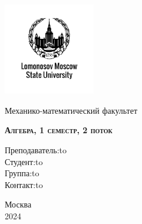 \documentclass[a4paper, 12pt]{article}
\theoremstyle{definition}
\begin{document}
  \begin{titlepage}
    \newpage
    
    \begin{center}
    \includegraphics[width=4cm]{image/image.png}
    \end{center}
    
    \vspace{4em}
    
    \begin{center}
    \Large Механико-математический факультет  
    \end{center}
    
    \vspace{2em}
    
    \begin{center}
    \large{\textsc{\textbf{Алгебра, 1 семестр, 2 поток}}}
    \end{center}
    
    \vspace{6em}
    

    
    \newbox{\lbox}
    \newlength{\maxl}
    \setlength{\maxl}{\wd\lbox}
    \hfill\parbox{11cm}
    {
    \hspace*{5cm}\hspace*{-5cm}Преподаватель:\hfill\hbox to \\

    \hspace*{5cm}\hspace*{-5cm}Студент:\hfill\hbox to\\

    \hspace*{5cm}\hspace*{-5cm}Группа:\hfill\hbox to \\
    
    \hspace*{5cm}\hspace*{-5cm}Контакт:\hfill\hbox to
    }

    \vspace{\fill}
    
    \begin{center}
    Москва \\2024 
    \end{center}
  \end{titlepage}
  \tableofcontents
  \fontsize{14pt}{20pt}\selectfont
  \newpage
  \fontsize{14pt}{20pt}\selectfont
\end{document}
